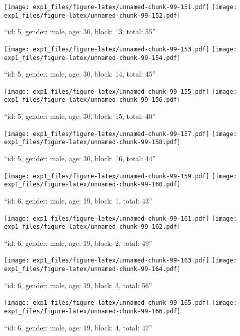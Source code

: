 \documentclass[,]{article}
\begin{document}
\texttt{[image: exp1\_files/figure-latex/unnamed-chunk-99-151.pdf]}
\texttt{[image: exp1\_files/figure-latex/unnamed-chunk-99-152.pdf]}

\newpage
[1] 

``id: 5, gender: male, age: 30, block: 13, total: 55''

\texttt{[image: exp1\_files/figure-latex/unnamed-chunk-99-153.pdf]}
\texttt{[image: exp1\_files/figure-latex/unnamed-chunk-99-154.pdf]}

\newpage
[1] 

``id: 5, gender: male, age: 30, block: 14, total: 45''

\texttt{[image: exp1\_files/figure-latex/unnamed-chunk-99-155.pdf]}
\texttt{[image: exp1\_files/figure-latex/unnamed-chunk-99-156.pdf]}

\newpage
[1] 

``id: 5, gender: male, age: 30, block: 15, total: 40''

\texttt{[image: exp1\_files/figure-latex/unnamed-chunk-99-157.pdf]}
\texttt{[image: exp1\_files/figure-latex/unnamed-chunk-99-158.pdf]}

\newpage
[1] 

``id: 5, gender: male, age: 30, block: 16, total: 44''

\texttt{[image: exp1\_files/figure-latex/unnamed-chunk-99-159.pdf]}
\texttt{[image: exp1\_files/figure-latex/unnamed-chunk-99-160.pdf]}

\newpage
[1] 

``id: 6, gender: male, age: 19, block: 1, total: 43''

\texttt{[image: exp1\_files/figure-latex/unnamed-chunk-99-161.pdf]}
\texttt{[image: exp1\_files/figure-latex/unnamed-chunk-99-162.pdf]}

\newpage
[1] 

``id: 6, gender: male, age: 19, block: 2, total: 49''

\texttt{[image: exp1\_files/figure-latex/unnamed-chunk-99-163.pdf]}
\texttt{[image: exp1\_files/figure-latex/unnamed-chunk-99-164.pdf]}

\newpage
[1] 

``id: 6, gender: male, age: 19, block: 3, total: 56''

\texttt{[image: exp1\_files/figure-latex/unnamed-chunk-99-165.pdf]}
\texttt{[image: exp1\_files/figure-latex/unnamed-chunk-99-166.pdf]}

\newpage
[1] 

``id: 6, gender: male, age: 19, block: 4, total: 47''
\end{document}
